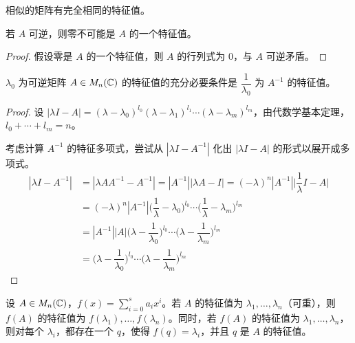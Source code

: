 \begin{theorem}
	相似的矩阵有完全相同的特征值。
\end{theorem}

\begin{theorem}
	若 $A$ 可逆，则零不可能是 $A$ 的一个特征值。
\end{theorem}

\begin{proof}
	假设零是 $A$ 的一个特征值，则 $A$ 的行列式为 $0$，与 $A$ 可逆矛盾。
\end{proof}

\begin{theorem}
	$\lambda_0$ 为可逆矩阵 $A \in M_n(\mathbb C)$ 的特征值的充分必要条件是 $\dfrac{1}{\lambda_0}$ 为 $A^{-1}$ 的特征值。
\end{theorem}

\begin{proof}
	设 $|\lambda I - A| = (\lambda - \lambda_0)^{l_0} (\lambda - \lambda_1)^{l_1} \cdots (\lambda - \lambda_m)^{l_m}$，由代数学基本定理，$l_0 + \cdots + l_m = n$。

	考虑计算 $A^{-1}$ 的特征多项式，尝试从 $|\lambda I - A^{-1}|$ 化出 $|\lambda I - A|$ 的形式以展开成多项式。
	$$
	\begin{aligned}
		|\lambda I - A^{-1}| &= |\lambda A A^{-1} - A^{-1}| = |A^{-1}| |\lambda A - I| = (-\lambda)^n |A^{-1}| \biggl| \dfrac{1}{\lambda} I - A \biggr|
		\\&=
		(-\lambda)^n |A^{-1}| \biggl( \dfrac{1}{\lambda} - \lambda_0 \biggr)^{l_0} \cdots \biggl( \dfrac{1}{\lambda} - \lambda_m \biggr)^{l_m}
		\\&=
		|A^{-1}||A| \biggl( \lambda - \dfrac{1}{\lambda_0} \biggr)^{l_0} \cdots \biggl( \lambda - \dfrac{1}{\lambda_m} \biggr)^{l_m}
		\\&=
		\biggl( \lambda - \dfrac{1}{\lambda_0} \biggr)^{l_0} \cdots \biggl( \lambda - \dfrac{1}{\lambda_m} \biggr)^{l_m}
	\end{aligned}
	$$
\end{proof}

\begin{theorem}
	设 $A \in M_n(\mathbb C)$，$f(x) = \sum\limits_{i = 0}^s a_i x^i$。若 $A$ 的特征值为 $\lambda_1, \ldots, \lambda_n$（可重），则 $f(A)$ 的特征值为 $f(\lambda_1), \ldots, f(\lambda_n)$。同时，若 $f(A)$ 的特征值为 $\lambda_1, \ldots, \lambda_n$，则对每个 $\lambda_i$，都存在一个 $q$，使得 $f(q) = \lambda_i$，并且 $q$ 是 $A$ 的特征值。
\end{theorem}

